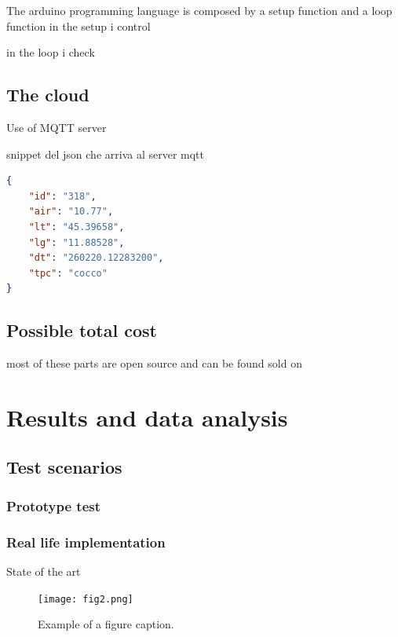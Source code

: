 \documentclass[conference]{IEEEtran}
\begin{document}
The arduino programming language is composed by a setup function and a loop function
in the setup i control 

in the loop i check

\subsection{The cloud}
Use of MQTT server 

snippet del json che arriva al server mqtt

\begin{lstlisting}[language=json,firstnumber=1]
{
    "id": "318",
    "air": "10.77",
    "lt": "45.39658",
    "lg": "11.88528",
    "dt": "260220.12283200",
    "tpc": "cocco"
}
\end{lstlisting}

\subsection{Possible total cost}

	most of these parts are open source and can be found sold on 
	
\section{Results and data analysis}\label{AA}
	\subsection{Test scenarios}

		\subsubsection{Prototype test}

		\subsubsection{Real life implementation}
			State of the art
	
	\begin{figure}[htbp]
		\centerline{\texttt{[image: fig2.png]}}
		\caption{Example of a figure caption.}
		\label{fig}
	\end{figure}
\end{document}
